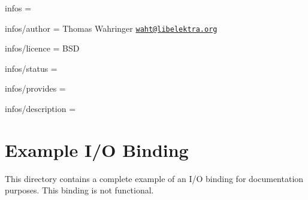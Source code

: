 
\begin{DoxyItemize}
\item infos =
\item infos/author = Thomas Wahringer \href{mailto:waht@libelektra.org}{\tt waht@libelektra.\+org}
\item infos/licence = B\+SD
\item infos/status =
\item infos/provides =
\item infos/description =
\end{DoxyItemize}\hypertarget{md_src_bindings_io_doc_README_src_bindings_io_doc_README_md}{}\section{Example I/\+O Binding}\label{md_src_bindings_io_doc_README_src_bindings_io_doc_README_md}
This directory contains a complete example of an I/O binding for documentation purposes. This binding is not functional. 